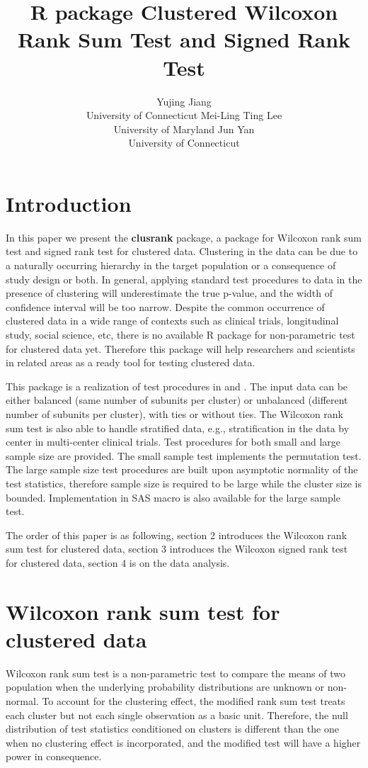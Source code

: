 \documentclass[article]{jss}
\author{Yujing Jiang\\ University of Connecticut \And 
        Mei-Ling Ting Lee\\ University of Maryland
        \And  
        Jun Yan\\ University of Connecticut }
\title{R package Clustered Wilcoxon Rank Sum Test and Signed Rank Test}
\begin{document}

\section{Introduction}
In this paper we present the \textbf{clusrank} package, a package 
for Wilcoxon rank sum test  
and signed rank test 
for clustered data.  
Clustering in the data can be due to 
a naturally occurring hierarchy in the target population
or a consequence of study design or both. 
In general,
applying standard test procedures to data in the presence 
of clustering will underestimate the true p-value, and 
the width of confidence interval will be too narrow.  
Despite the common occurrence of 
clustered data in a wide range of contexts such as 
clinical trials, longitudinal study, social science, etc,
there is no available R package for non-parametric test
for clustered data yet. Therefore this package will help 
researchers and scientists in related areas as a ready tool
for testing clustered data.


This package is a realization of test procedures in 
\citet{Rosn:GLyn:Lee:inco:2003} and \citet{Roxn:Glyn:Lee:wilc:2006}.
The input data can be either balanced (same number of 
subunits per cluster) or unbalanced (different number of subunits 
per cluster), with ties or without ties. The Wilcoxon rank sum
test is also able to handle stratified data, e.g., stratification in the data
by center in multi-center clinical trials. Test procedures for both small and large sample size are provided. The small sample test implements the permutation test. The large sample size test
procedures are built upon asymptotic normality of the test statistics, therefore
sample size is required to be large while the cluster size is bounded. Implementation in
SAS macro is also available for the large sample test.


The order of this paper is as following, 
section 2 introduces the Wilcoxon rank 
sum test for clustered data, section 3 
introduces the Wilcoxon signed rank test 
for clustered data, section 4 is on the 
data analysis.


\section{Wilcoxon rank sum test for clustered data}
Wilcoxon rank sum test is a non-parametric test
to compare the means of two population when the 
underlying probability distributions are unknown 
or non-normal. To account for the clustering effect,
the modified rank sum test treats each cluster but not 
each single observation as a basic unit. 
Therefore, the null distribution of test statistics
conditioned on clusters is different than the one
when no clustering effect is incorporated,
and the modified test will have a higher power in 
consequence. 
\end{document}
